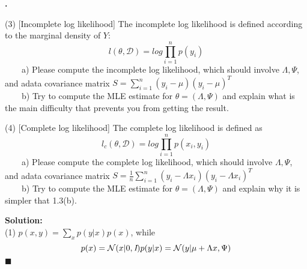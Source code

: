 \documentclass{article}
\newcounter{pcounter}                                   %
\newenvironment{problem}                                %
{                                                       %
    \stepcounter{pcounter}                              %
    \textbf{\arabic{pcounter}.}                         %
}{}                                                     %
\newenvironment{solution}                               %
{\textbf{Solution:} \\}{$\blacksquare$\newline}         %
\newcommand{\tab}{\ \ \ \ }                             %
\newcommand{\Gaussian}{\mathcal{N}}                     %
\newcommand{\IdenMat}{\textit{I}}                       %
\begin{document}
\begin{problem}
        (3) [Incomplete log likelihood] The incomplete log likelihood is defined according to the marginal density of $Y$:
        $$
        l(\theta, \mathcal{D}) = log \prod\limits_{i=1}^{n} p(y_i)
        $$
        \tab a) Please compute the incomplete log likelihood, which should involve $\Lambda, \Psi$, and adata covariance matrix 
        $S=\sum_{i=1}^n (y_i - \mu)(y_i - \mu)^T$ \\
        \tab b) Try to compute the MLE estimate for $\theta = (\Lambda, \Psi)$ and explain what is the main difficulty that prevents you from getting the result.

        (4) [Complete log likelihood] The complete log likelihood is defined as 
        $$
        l_c(\theta, \mathcal{D}) = log \prod\limits_{i=1}^{n} p(x_i, y_i)
        $$
        \tab a) Please compute the complete log likelihood, which should involve $\Lambda, \Psi$, and adata covariance matrix 
        $S=\frac{1}{n} \sum_{i=1}^n (y_i - \Lambda x_i)(y_i - \Lambda x_i)^T$ \\
        \tab b) Try to compute the MLE estimate for $\theta = (\Lambda, \Psi)$ and explain why it is simpler that 1.3(b).
    \end{problem}

    \begin{solution}
        (1) $p(x, y) = \sum_x p(y|x) p(x)$, while
        $$
        p(x) = \Gaussian(x | 0, \IdenMat)
        \\
        p(y|x) = \Gaussian(y | \mu+\Lambda x, \Psi)
        \\
        $$
    \end{solution}
\end{document}
